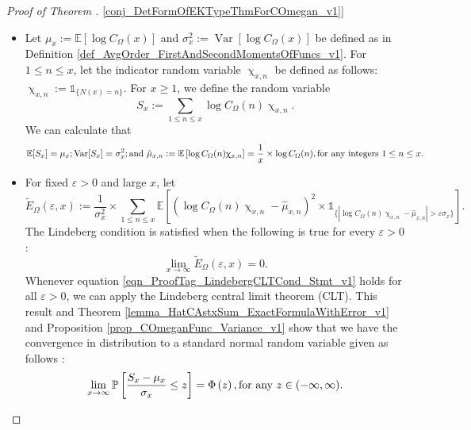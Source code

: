\documentclass[11pt,reqno,a4letter]{article}
\newcommand{\hlocalref}[1]{\hyperref[#1]{\ref{#1}}}
\numberwithin{equation}{section}
\numberwithin{figure}{section}
\numberwithin{table}{section}
\renewcommand{\chi}{\upchi}
\theoremstyle{plain}
\numberwithin{theorem}{section}
\theoremstyle{definition}
\theoremstyle{remark}
\newcommand{\mathtext}[1]{\text{\rm #1}}
\begin{document}
\begin{proof}[Proof of Theorem \hlocalref{conj_DetFormOfEKTypeThmForCOmegan_v1}]
\begin{itemize}
Moreover, we can show that as $x \rightarrow \infty$ 
\[
\mathbb{E}[A_{N(x)}] \ll \sum_{p \leq x} \mathbb{E}\left[C_p^{(x)} \log C_p^{(x)}\right] 
     \times \mathbb{P}\left[C_p^{(x)} \geq 2\right] = o\left(\mathbb{E}[\Theta_{N(x)}]\right). 
\]
Analogous bounds can be proved to relate the variance of these 
two random variables as $x \rightarrow \infty$. 
\item 
Let $\mu_x := \mathbb{E}\left[\log C_{\Omega}(x)\right]$ and 
$\sigma_x^2 := \operatorname{Var}\left[\log C_{\Omega}(x)\right]$ be defined as in 
Definition \hlocalref{def_AvgOrder_FirstAndSecondMomentsOfFuncs_v1}. 
For $1 \leq n \leq x$, let the indicator random variable $\chi_{x,n}$ 
be defined as follows: $\chi_{x,n} := \mathds{1}_{\{N(x)=n\}}$. 
For $x \geq 1$, we define the random variable 
\[
S_x := \sum_{1 \leq n \leq x} \log C_{\Omega}(n) \chi_{x,n}. 
\]
We can calculate that 
\[
\mathbb{E}[S_x] = \mu_x; \operatorname{Var}[S_x] = \sigma_x^2; 
     \mathtext{ and } 
     \hat{\mu}_{x,n} := \mathbb{E}\left[\log C_{\Omega}(n) \chi_{x,n}\right] = 
     \frac{1}{x} \times \log C_{\Omega}(n), 
     \mathtext{ for any integers } 1 \leq n \leq x. 
\]
\item 
For fixed $\varepsilon > 0$ and large $x$, let 
\[
\widetilde{E}_{\Omega}(\varepsilon, x) := \frac{1}{\sigma_x^2} \times 
     \sum_{1 \leq n \leq x} \mathbb{E}\left[ 
     \left(\log C_{\Omega}(n) \chi_{x,n} - \hat{\mu}_{x,n}\right)^2 
     \times 
     \mathds{1}_{\{\left\lvert \log C_{\Omega}(n) \chi_{x,n} - \hat{\mu}_{x,n} \right\rvert > 
     \varepsilon \sigma_x\}}\right]. 
\]
The Lindeberg condition is satisfied when the following 
is true for every $\varepsilon > 0$: 
\begin{equation}
\label{eqn_ProofTag_LindebergCLTCond_Stmt_v1}
\lim_{x \rightarrow \infty} \widetilde{E}_{\Omega}(\varepsilon, x) = 0. 
\end{equation}
Whenever equation \eqref{eqn_ProofTag_LindebergCLTCond_Stmt_v1} holds for all $\varepsilon > 0$, 
we can apply the Lindeberg central limit theorem (CLT). This result and 
Theorem \hlocalref{lemma_HatCAstxSum_ExactFormulaWithError_v1} and 
Proposition \hlocalref{prop_COmeganFunc_Variance_v1} show that we have the 
convergence in distribution to a standard normal random variable given as follows 
\cite[\S 27]{BILLINGSLY-PROB-AND-MEASURE-BOOK}: 
\begin{equation}
\label{eqn_ProofTag_LindebergCLT_Conclusion_Stmt_v2}
\lim_{x \rightarrow \infty} 
     \mathbb{P}\left[\frac{S_x - \mu_x}{\sigma_x} \leq z\right] = 
	\Phi\left(z\right), \mathtext{ for any } z \in (-\infty, \infty).

\end{equation}
\end{itemize}
\end{proof}
\end{document}
